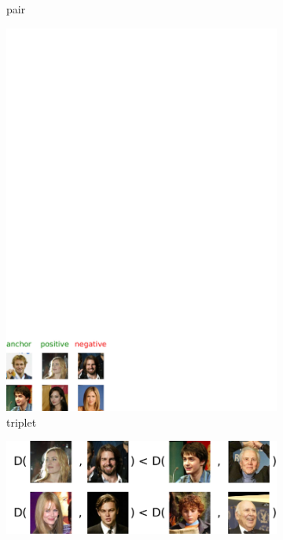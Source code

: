 \documentclass[twoside,11pt]{article}
\begin{document}
\begin{figure}[t]
\begin{subfigure}[t]{0.20\textwidth}
        \caption{pair}\label{fig:pairs}
    \end{subfigure}
    \begin{subfigure}[t]{0.31\textwidth}
        \centering \includegraphics[scale=0.35]{triplets.pdf}
	\caption{triplet}\label{fig:triplets}
    \end{subfigure}
    \begin{subfigure}[t]{0.31\textwidth}
        \centering \includegraphics[scale=0.35]{quadruplets.pdf}

\end{subfigure}
\end{figure}
\end{document}
